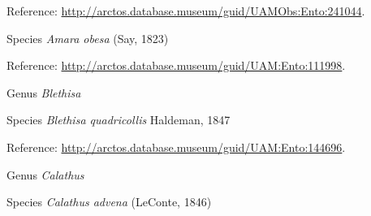 \documentclass[9pt, article]{memoir}
\begin{document}
\begin{multicols}{2}
Reference: 
\url{http://arctos.database.museum/guid/UAMObs:Ento:241044}.

\vspace{6pt}\noindent\hspace{36pt}Species \textit{Amara obesa} (Say, 1823)


Reference: 
\url{http://arctos.database.museum/guid/UAM:Ento:111998}.

\vspace{6pt}\noindent\hspace{30pt}Genus \textit{Blethisa}


\vspace{6pt}\noindent\hspace{36pt}Species \textit{Blethisa quadricollis} Haldeman, 1847


Reference: 
\url{http://arctos.database.museum/guid/UAM:Ento:144696}.

\vspace{6pt}\noindent\hspace{30pt}Genus \textit{Calathus}


\vspace{6pt}\noindent\hspace{36pt}Species \textit{Calathus advena} (LeConte, 1846)



\end{multicols}
\end{document}
